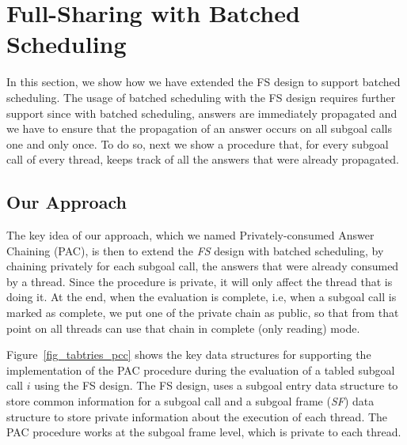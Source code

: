 \documentclass{llncs}
\begin{document}
\section{Full-Sharing with Batched Scheduling}

In this section, we show how we have extended the FS design to support
batched scheduling. The usage of batched scheduling with the FS design
requires further support since with batched scheduling, answers are
immediately propagated and we have to ensure that the propagation of
an answer occurs on all subgoal calls one and only once. To do so,
next we show a procedure that, for every subgoal call of every thread,
keeps track of all the answers that were already propagated.

\subsection{Our Approach}

The key idea of our approach, which we named Privately-consumed Answer
Chaining (PAC), is then to extend the \emph{FS} design with batched
scheduling, by chaining privately for each subgoal call, the answers
that were already consumed by a thread. Since the procedure is
private, it will only affect the thread that is doing it. At the end,
when the evaluation is complete, i.e, when a subgoal call is marked as
complete, we put one of the private chain as public, so that from that
point on all threads can use that chain in complete (only reading)
mode.

Figure~\ref{fig_tabtries_pcc} shows the key data structures for
supporting the implementation of the PAC procedure during the
evaluation of a tabled subgoal call $i$ using the FS design. The FS
design, uses a subgoal entry data structure to store common
information for a subgoal call and a subgoal frame (\emph{SF}) data
structure to store private information about the execution of each
thread. The PAC procedure works at the subgoal frame level, which is
private to each thread.
\end{document}

